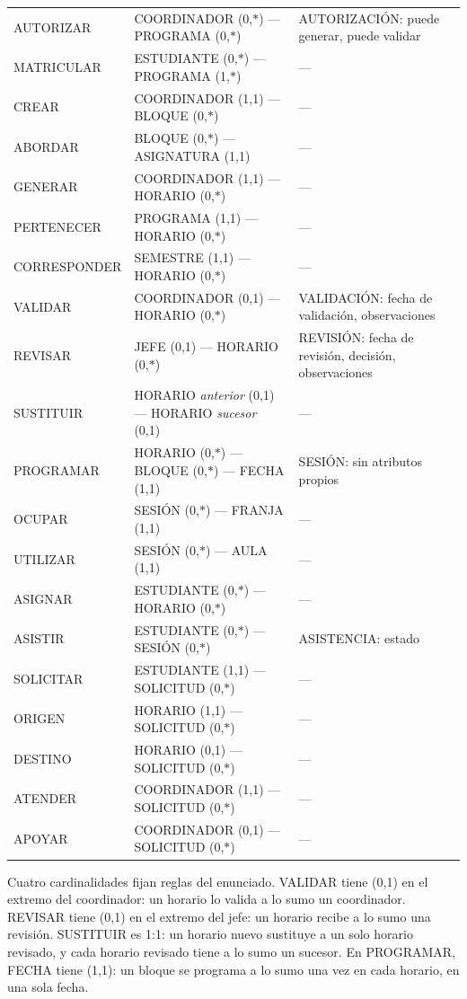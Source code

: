 {\small\filas
\begin{xltabular}{\linewidth}{L{0.55}L{1.3}L{1.15}}
 &  &  \\
\endhead
AUTORIZAR & COORDINADOR (0,$*$) --- PROGRAMA (0,$*$) & AUTORIZACIÓN: puede generar, puede validar \\
MATRICULAR & ESTUDIANTE (0,$*$) --- PROGRAMA (1,$*$) & --- \\
CREAR & COORDINADOR (1,1) --- BLOQUE (0,$*$) & --- \\
ABORDAR & BLOQUE (0,$*$) --- ASIGNATURA (1,1) & --- \\
GENERAR & COORDINADOR (1,1) --- HORARIO (0,$*$) & --- \\
PERTENECER & PROGRAMA (1,1) --- HORARIO (0,$*$) & --- \\
CORRESPONDER & SEMESTRE (1,1) --- HORARIO (0,$*$) & --- \\
VALIDAR & COORDINADOR (0,1) --- HORARIO (0,$*$) & VALIDACIÓN: fecha de validación, observaciones \\
REVISAR & JEFE (0,1) --- HORARIO (0,$*$) & REVISIÓN: fecha de revisión, decisión, observaciones \\
SUSTITUIR & HORARIO \emph{anterior} (0,1) --- HORARIO \emph{sucesor} (0,1) & --- \\
PROGRAMAR & HORARIO (0,$*$) --- BLOQUE (0,$*$) --- FECHA (1,1) & SESIÓN: sin atributos propios \\
OCUPAR & SESIÓN (0,$*$) --- FRANJA (1,1) & --- \\
UTILIZAR & SESIÓN (0,$*$) --- AULA (1,1) & --- \\
ASIGNAR & ESTUDIANTE (0,$*$) --- HORARIO (0,$*$) & --- \\
ASISTIR & ESTUDIANTE (0,$*$) --- SESIÓN (0,$*$) & ASISTENCIA: estado \\
SOLICITAR & ESTUDIANTE (1,1) --- SOLICITUD (0,$*$) & --- \\
ORIGEN & HORARIO (1,1) --- SOLICITUD (0,$*$) & --- \\
DESTINO & HORARIO (0,1) --- SOLICITUD (0,$*$) & --- \\
ATENDER & COORDINADOR (1,1) --- SOLICITUD (0,$*$) & --- \\
APOYAR & COORDINADOR (0,1) --- SOLICITUD (0,$*$) & --- \\
\end{xltabular}}

Cuatro cardinalidades fijan reglas del enunciado. VALIDAR tiene (0,1) en el extremo del coordinador: un horario lo valida a lo sumo un coordinador. REVISAR tiene (0,1) en el extremo del jefe: un horario recibe a lo sumo una revisión. SUSTITUIR es 1:1: un horario nuevo sustituye a un solo horario revisado, y cada horario revisado tiene a lo sumo un sucesor. En PROGRAMAR, FECHA tiene (1,1): un bloque se programa a lo sumo una vez en cada horario, en una sola fecha.

